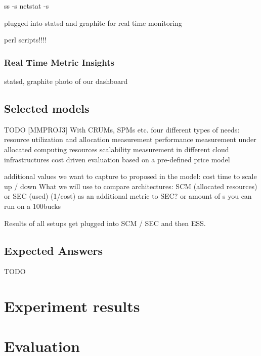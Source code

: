 \documentclass{uvamscse}
\begin{document}
ss -s
netstat -s

plugged into statsd and graphite for real time monitoring

perl scripts!!!!

\subsection{Real Time Metric Insights} \label{Real Time Metric Insights}
statsd, graphite
photo of our dashboard

\section{Selected models}\label{Selected models}
TODO
[MMPROJ3] With CRUMs, SPMs etc.
four different types of needs:
resource utilization and allocation measurement
performance measurement under allocated computing resources
scalability measurement in different cloud infrastructures
cost driven evaluation based on a pre-defined price model

additional values we want to capture to proposed in the model:
cost
time to scale up / down
What we will use to compare architectures:
SCM (allocated resources) or SEC (used)
(1/cost) as an additional metric to SEC? or amount of s you can run on a 100bucks

Results of all setups get plugged into SCM / SEC and then ESS.


\section{Expected Answers}\label{Expected Answers}
TODO


\chapter{Experiment results}\label{Experiment results}


\chapter{Evaluation}\label{Evaluation}
\end{document}
